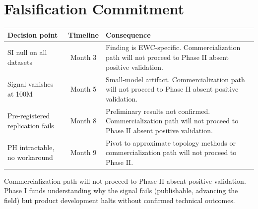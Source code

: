 \documentclass[11pt,letterpaper]{article}
\begin{document}
\section{Falsification Commitment}

\begin{center}
\begin{tabular}{@{}p{4cm}cp{7.5cm}@{}}
\toprule
\textbf{Decision point} & \textbf{Timeline} & \textbf{Consequence} \\
\midrule
SI null on all datasets & Month 3 & Finding is EWC-specific. Commercialization path will not proceed to Phase II absent positive validation. \\
Signal vanishes at 100M & Month 5 & Small-model artifact. Commercialization path will not proceed to Phase II absent positive validation. \\
Pre-registered replication fails & Month 8 & Preliminary results not confirmed. Commercialization path will not proceed to Phase II absent positive validation. \\
PH intractable, no workaround & Month 9 & Pivot to approximate topology methods or commercialization path will not proceed to Phase II. \\
\bottomrule
\end{tabular}
\end{center}

Commercialization path will not proceed to Phase II absent positive validation. Phase I funds understanding why the signal fails (publishable, advancing the field) but product development halts without confirmed technical outcomes.
\end{document}
